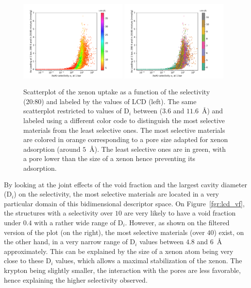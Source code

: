 \documentclass[main.tex]{subfiles}
\begin{document}
\begin{figure}[ht!]
  \centering
  \includegraphics[width=0.48\textwidth]{figures/2-thermo/Scatterplot_uptake_selectivity_lcd.pdf}
  \includegraphics[width=0.48\textwidth]{figures/2-thermo/Scatterplot_uptake_selectivity_lcd_zoom.pdf}
  \caption{Scatterplot of the xenon uptake as a function of the selectivity (20:80) and labeled by the values of LCD (left). The same scatterplot restricted to values of D$_i$ between ($3.6$ and $11.6$~\si{\angstrom}) and labeled using a different color code to distinguish the most selective materials from the least selective ones. The most selective materials are colored in orange corresponding to a pore size adapted for xenon adsorption (around $5$~\si{\angstrom}). The least selective ones are in green, with a pore lower than the size of a xenon hence preventing its adsorption.}\label{fgr:lcd}
\end{figure}

By looking at the joint effects of the void fraction and the largest cavity diameter (D$_i$) on the selectivity, the most selective materials are located in a very particular domain of this bidimensional descriptor space. On Figure~\ref{fgr:lcd_vf}, the structures with a selectivity over $10$ are very likely to have a void fraction under $0.4$ with a rather wide range of D$_i$. However, as shown on the filtered version of the plot (on the right), the most selective materials (over $40$) exist, on the other hand, in a very narrow range of D$_i$ values between $4.8$ and $6$~\si{\angstrom} approximately. This can be explained by the size of a xenon atom being very close to these D$_i$ values, which allows a maximal stabilization of the xenon. The krypton being slightly smaller, the interaction with the pores are less favorable, hence explaining the higher selectivity observed. 
\end{document}
